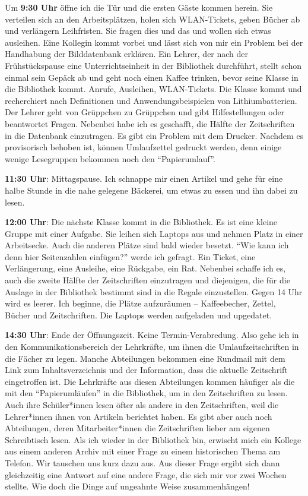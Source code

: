 \documentclass[a4paper,
fontsize=11pt,
oneside,
numbers=noperiodatend,
parskip=half-,
bibliography=totoc,
final
]{scrartcl}
\begin{document}
Um \textbf{9:30 Uhr} öffne ich die Tür und die ersten Gäste kommen
herein. Sie verteilen sich an den Arbeitsplätzen, holen sich
WLAN-Tickets, geben Bücher ab und verlängern Leihfristen. Sie fragen
dies und das und wollen sich etwas ausleihen. Eine Kollegin kommt vorbei
und lässt sich von mir ein Problem bei der Handhabung der Bilddatenbank
erklären. Ein Lehrer, der nach der Frühstückspause eine
Unterrichtseinheit in der Bibliothek durchführt, stellt schon einmal
sein Gepäck ab und geht noch einen Kaffee trinken, bevor seine Klasse in
die Bibliothek kommt. Anrufe, Ausleihen, WLAN-Tickets. Die Klasse kommt
und recherchiert nach Definitionen und Anwendungsbeispielen von
Lithiumbatterien. Der Lehrer geht von Grüppchen zu Grüppchen und gibt
Hilfestellungen oder beantwortet Fragen. Nebenbei habe ich es geschafft,
die Hälfte der Zeitschriften in die Datenbank einzutragen. Es gibt ein
Problem mit dem Drucker. Nachdem es provisorisch behoben ist, können
Umlaufzettel gedruckt werden, denn einige wenige Lesegruppen bekommen
noch den \enquote{Papierumlauf}.

\textbf{11:30 Uhr}: Mittagspause. Ich schnappe mir einen Artikel und
gehe für eine halbe Stunde in die nahe gelegene Bäckerei, um etwas zu
essen und ihn dabei zu lesen.

\textbf{12:00 Uhr}: Die nächste Klasse kommt in die Bibliothek. Es ist
eine kleine Gruppe mit einer Aufgabe. Sie leihen sich Laptops aus und
nehmen Platz in einer Arbeitsecke. Auch die anderen Plätze sind bald
wieder besetzt. \enquote{Wie kann ich denn hier Seitenzahlen einfügen?}
werde ich gefragt. Ein Ticket, eine Verlängerung, eine Ausleihe, eine
Rückgabe, ein Rat. Nebenbei schaffe ich es, auch die zweite Hälfte der
Zeitschriften einzutragen und diejenigen, die für die Auslage in der
Bibliothek bestimmt sind in die Regale einzustellen. Gegen 14 Uhr wird
es leerer. Ich beginne, die Plätze aufzuräumen -- Kaffeebecher, Zettel,
Bücher und Zeitschriften. Die Laptops werden aufgeladen und upgedatet.

\textbf{14:30 Uhr}: Ende der Öffnungszeit. Keine Termin-Verabredung.
Also gehe ich in den Kommunikationsbereich der Lehrkräfte, um ihnen die
Umlaufzeitschriften in die Fächer zu legen. Manche Abteilungen bekommen
eine Rundmail mit dem Link zum Inhaltsverzeichnis und der Information,
dass die aktuelle Zeitschrift eingetroffen ist. Die Lehrkräfte aus
diesen Abteilungen kommen häufiger als die mit den
\enquote{Papierumläufen} in die Bibliothek, um in den Zeitschriften zu
lesen. Auch ihre Schüler*innen lesen öfter als andere in den
Zeitschriften, weil die Lehrer*innen ihnen von Artikeln berichtet haben.
Es gibt aber auch noch Abteilungen, deren Mitarbeiter*innen die
Zeitschriften lieber am eigenen Schreibtisch lesen. Als ich wieder in
der Bibliothek bin, erwischt mich ein Kollege aus einem anderen Archiv
mit einer Frage zu einem historischen Thema am Telefon. Wir tauschen uns
kurz dazu aus. Aus dieser Frage ergibt sich dann gleichzeitig eine
Antwort auf eine andere Frage, die sich mir vor zwei Wochen stellte. Wie
doch die Dinge auf ungeahnte Weise zusammenhängen!
\end{document}
